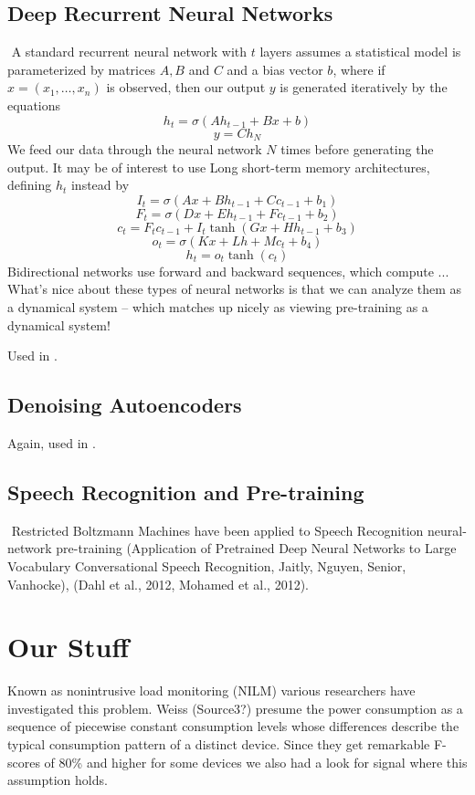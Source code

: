 \documentclass{article}
\begin{document}
\subsection{Deep Recurrent Neural Networks}
​
A standard recurrent neural network with $t$ layers assumes a statistical model is parameterized by matrices $A,B$ and $C$ and a bias vector $b$, where if $x = (x_1, \dots, x_n)$ is observed, then our output $y$ is generated iteratively by the equations
%
\[ h_t = \sigma(A h_{t-1} + B x + b) \]
%
\[ y = C h_N \]
%
We feed our data through the neural network $N$ times before generating the output. It may be of interest to use Long short-term memory architectures, defining $h_t$ instead by
%
\[ I_t = \sigma(Ax + B h_{t-1} + C c_{t-1} + b_1) \]
%
\[ F_t = \sigma(Dx + E h_{t-1} + F c_{t-1} + b_2) \]
%
\[ c_t = F_t c_{t-1} + I_t \tanh(G x + H h_{t-1} + b_3) \]
%
\[ o_t = \sigma(K x + L h + M c_t + b_4) \]
%
\[ h_t = o_t \tanh(c_t) \]
​
Bidirectional networks use forward and backward sequences, which compute ...
​
What's nice about these types of neural networks is that we can analyze them as a dynamical system -- which matches up nicely as viewing pre-training as a dynamical system!

Used in \cite{Kelly}.

\subsection{Denoising Autoencoders}

Again, used in \cite{Kelly}.
​
\subsection{Speech Recognition and Pre-training}
​
Restricted Boltzmann Machines have been applied to Speech Recognition neural-network pre-training (Application of Pretrained Deep
Neural Networks to Large
Vocabulary Conversational Speech
Recognition, Jaitly, Nguyen, Senior, Vanhocke), (Dahl et al., 2012, Mohamed et al., 2012).




\section{Our Stuff}

Known as nonintrusive load monitoring (NILM) various researchers have investigated this problem. Weiss (Source3?) presume the power consumption as a sequence of piecewise constant consumption levels whose differences describe the typical consumption pattern of a distinct device. Since they get remarkable F-scores of 80\% and higher for some devices we also had a look for signal where this assumption holds.
\end{document}
